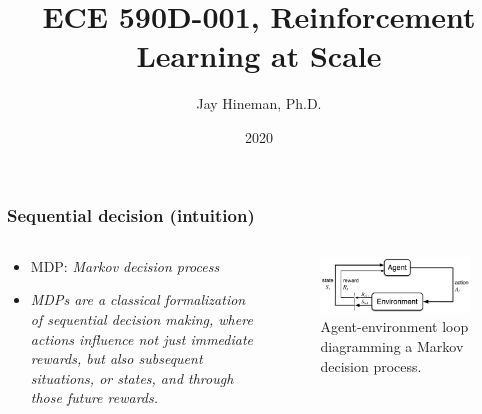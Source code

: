 \documentclass{beamer}
\title{ECE 590D-001, Reinforcement Learning at Scale}
\author{Jay Hineman, Ph.D.}
\institute{Geometric Data Analytics}
\date{2020}
\begin{document}
 
\frame{\titlepage}

\begin{frame}
  \frametitle{Sequential decision (intuition)}
  \begin{columns}[T]
    \begin{column}{.5\textwidth}
      \begin{itemize}
      \item MDP: {\em Markov decision process}
      \item {\em MDPs are a classical formalization of sequential decision
          making, where actions influence not just immediate rewards, but also subsequent
          situations, or states, and through those future rewards.}
      \end{itemize}
    \end{column}
    \begin{column}{.5\textwidth}
      \begin{figure}
        \label{fig:mdp-agent-env-loop}
        \includegraphics[width=\textwidth]{../images/agent-environment-loop.png}
        \caption{Agent-environment loop diagramming a Markov decision process.}
      \end{figure}
    \end{column}
 \end{columns}
\end{frame}
\end{document}
